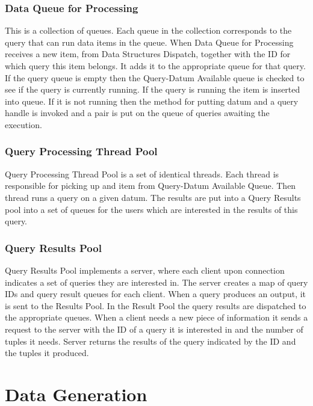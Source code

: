 \documentclass[11pt]{article}
\begin{document}
\subsubsection{Data Queue for Processing}

This is a collection of queues. Each queue in the collection corresponds to the query that can run data items in the queue. When Data Queue for Processing receives a new item, from Data Structures Dispatch, together with the ID for which query this item belongs. It adds it to the appropriate queue for that query. If the query queue is empty then the Query-Datum Available queue is checked to see if the query is currently running. If the query is running the item is inserted into queue. If it is not running then the method for putting datum and a query handle is invoked and a pair is put on the queue of queries awaiting the execution.

\subsubsection{Query Processing Thread Pool}

Query Processing Thread Pool is a set of identical threads. Each thread is responsible for picking up and item from Query-Datum Available Queue. Then thread runs a query on a given datum. The results are put into a Query Results pool into a set of queues for the users which are interested in the results of this query. 

\subsubsection{Query Results Pool}

Query Results Pool implements a server, where each client upon connection indicates a set of queries they are interested in. The server creates a map of query IDs and query result queues for each client. When a query produces an output, it is sent to the Results Pool. In the Result Pool the query results are dispatched to the appropriate queues. When a client needs a new piece of information it sends a request to the server with the ID of a query it is interested in and the number of tuples it needs. Server returns the results of the query indicated by the ID and the tuples it produced. 

\section{Data Generation}
\end{document}
